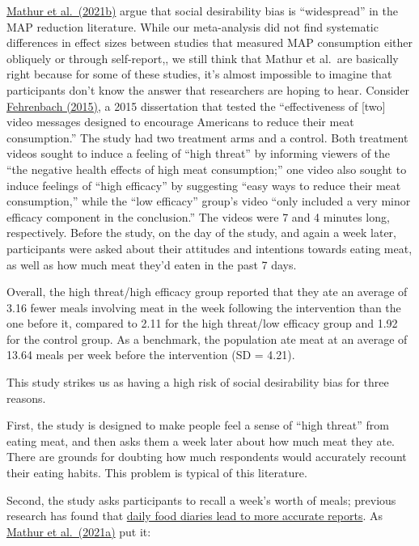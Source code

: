 \documentclass[
  letterpaper,
  DIV=11,
  numbers=noendperiod]{scrartcl}
\begin{document}
\href{https://www.mdpi.com/2072-6643/13/12/4555}{Mathur et al.~(2021b)}
argue that social desirability bias is ``widespread'' in the MAP
reduction literature. While our meta-analysis did not find systematic
differences in effect sizes between studies that measured MAP
consumption either obliquely or through self-report,, we still think
that Mathur et al.~are basically right because for some of these
studies, it's almost impossible to imagine that participants don't know
the answer that researchers are hoping to hear. Consider
\href{https://www.proquest.com/docview/1712399091?fromopenview=true&pq-origsite=gscholar}{Fehrenbach
(2015)}, a 2015 dissertation that tested the ``effectiveness of
{[}two{]} video messages designed to encourage Americans to reduce their
meat consumption.'' The study had two treatment arms and a control. Both
treatment videos sought to induce a feeling of ``high threat'' by
informing viewers of the ``the negative health effects of high meat
consumption;'' one video also sought to induce feelings of ``high
efficacy'' by suggesting ``easy ways to reduce their meat consumption,''
while the ``low efficacy'' group's video ``only included a very minor
efficacy component in the conclusion.'' The videos were 7 and 4 minutes
long, respectively. Before the study, on the day of the study, and again
a week later, participants were asked about their attitudes and
intentions towards eating meat, as well as how much meat they'd eaten in
the past 7 days.

Overall, the high threat/high efficacy group reported that they ate an
average of 3.16 fewer meals involving meat in the week following the
intervention than the one before it, compared to 2.11 for the high
threat/low efficacy group and 1.92 for the control group. As a
benchmark, the population ate meat at an average of 13.64 meals per week
before the intervention (SD = 4.21).

This study strikes us as having a high risk of social desirability bias
for three reasons.

First, the study is designed to make people feel a sense of ``high
threat'' from eating meat, and then asks them a week later about how
much meat they ate. There are grounds for doubting how much respondents
would accurately recount their eating habits. This problem is typical of
this literature.

Second, the study asks participants to recall a week's worth of meals;
previous research has found that
\href{https://pubmed.ncbi.nlm.nih.gov/7635601/}{daily food diaries lead
to more accurate reports}. As
\href{https://www.sciencedirect.com/science/article/pii/S0195666321001847}{Mathur
et al.~(2021a)} put it:
\end{document}
